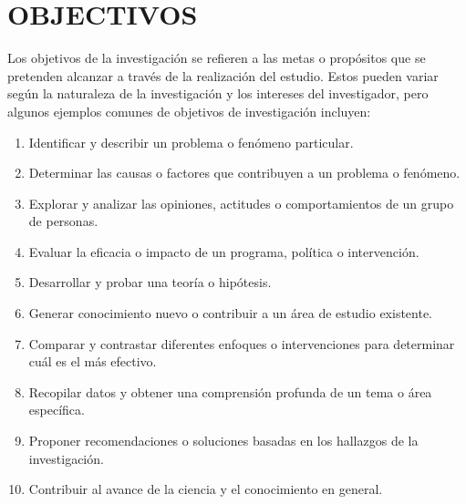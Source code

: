 \documentclass[12pt,a4paper]{article}
\begin{document}

\section{OBJECTIVOS}
Los objetivos de la investigación se refieren a las metas o propósitos que se pretenden alcanzar a través de la realización del estudio. Estos pueden variar según la naturaleza de la investigación y los intereses del investigador, pero algunos ejemplos comunes de objetivos de investigación incluyen:

\begin{enumerate}
\item  Identificar y describir un problema o fenómeno particular.
\item  Determinar las causas o factores que contribuyen a un problema o fenómeno.
\item  Explorar y analizar las opiniones, actitudes o comportamientos de un grupo de personas.
\item  Evaluar la eficacia o impacto de un programa, política o intervención.
\item  Desarrollar y probar una teoría o hipótesis.
\item  Generar conocimiento nuevo o contribuir a un área de estudio existente.
\item  Comparar y contrastar diferentes enfoques o intervenciones para determinar cuál es el más efectivo.
\item  Recopilar datos y obtener una comprensión profunda de un tema o área específica.
\item  Proponer recomendaciones o soluciones basadas en los hallazgos de la investigación.
\item  Contribuir al avance de la ciencia y el conocimiento en general.
\end{enumerate}
\end{document}
